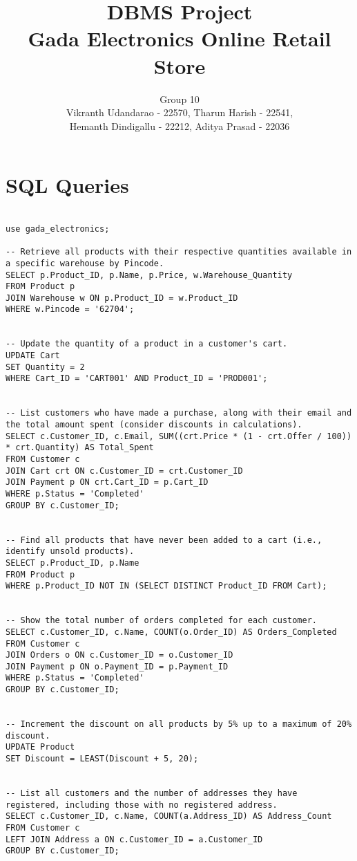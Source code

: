 \documentclass[12pt]{article}
\begin{document}
\title{\textbf{DBMS Project\\ Gada Electronics Online Retail Store}}
\author{Group 10 \\ Vikranth Udandarao - 22570, Tharun Harish - 22541, \\ Hemanth Dindigallu - 22212, Aditya Prasad - 22036}
\date{}
\maketitle

\section*{SQL Queries}

\begin{verbatim}

use gada_electronics;

-- Retrieve all products with their respective quantities available in a specific warehouse by Pincode.
SELECT p.Product_ID, p.Name, p.Price, w.Warehouse_Quantity
FROM Product p
JOIN Warehouse w ON p.Product_ID = w.Product_ID
WHERE w.Pincode = '62704';


-- Update the quantity of a product in a customer's cart.
UPDATE Cart
SET Quantity = 2
WHERE Cart_ID = 'CART001' AND Product_ID = 'PROD001';


-- List customers who have made a purchase, along with their email and the total amount spent (consider discounts in calculations).
SELECT c.Customer_ID, c.Email, SUM((crt.Price * (1 - crt.Offer / 100)) * crt.Quantity) AS Total_Spent
FROM Customer c
JOIN Cart crt ON c.Customer_ID = crt.Customer_ID
JOIN Payment p ON crt.Cart_ID = p.Cart_ID
WHERE p.Status = 'Completed'
GROUP BY c.Customer_ID;


-- Find all products that have never been added to a cart (i.e., identify unsold products).
SELECT p.Product_ID, p.Name
FROM Product p
WHERE p.Product_ID NOT IN (SELECT DISTINCT Product_ID FROM Cart);


-- Show the total number of orders completed for each customer.
SELECT c.Customer_ID, c.Name, COUNT(o.Order_ID) AS Orders_Completed
FROM Customer c
JOIN Orders o ON c.Customer_ID = o.Customer_ID
JOIN Payment p ON o.Payment_ID = p.Payment_ID
WHERE p.Status = 'Completed'
GROUP BY c.Customer_ID;


-- Increment the discount on all products by 5% up to a maximum of 20% discount.
UPDATE Product
SET Discount = LEAST(Discount + 5, 20);


-- List all customers and the number of addresses they have registered, including those with no registered address.
SELECT c.Customer_ID, c.Name, COUNT(a.Address_ID) AS Address_Count
FROM Customer c
LEFT JOIN Address a ON c.Customer_ID = a.Customer_ID
GROUP BY c.Customer_ID;



\end{verbatim}
\end{document}
